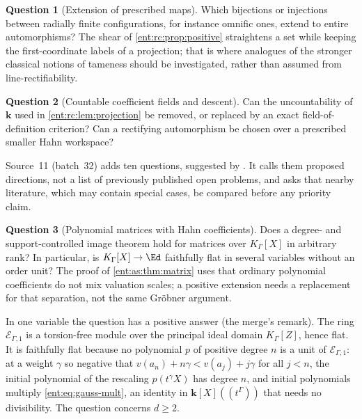 \documentclass[11pt]{article}
\theoremstyle{plain}
\theoremstyle{plain}
\theoremstyle{plain}
\theoremstyle{definition}
\theoremstyle{definition}
\theoremstyle{definition}
\theoremstyle{definition}
\newtheorem{question}[question]{Question}
\theoremstyle{remark}
\newcommand{\K}{K_\Gamma}\newcommand{\KD}{K_\Delta}
\newcommand{\kk}{\mathbf k}\newcommand{\PP}{\mathbb P}
\begin{document}
\begin{question}[Extension of prescribed maps]\label{ent:rc:q:extension}
Which bijections or injections between radially finite configurations, for
instance omnific ones, extend to entire automorphisms? The shear of
\cref{ent:rc:prop:positive} straightens a set while keeping the
first-coordinate labels of a projection; that is where analogues of the
stronger classical notions of tameness should be investigated, rather than
assumed from line-rectifiability.
\end{question}

\begin{question}[Countable coefficient fields and descent]
\label{ent:rc:q:descent}
Can the uncountability of $\kk$ used in \cref{ent:rc:lem:projection} be
removed, or replaced by an exact field-of-definition criterion? Can a
rectifying automorphism be chosen over a prescribed smaller Hahn workspace?
\end{question}

Source~11 (batch~32) adds ten questions, suggested by
. It calls them proposed
directions, not a list of previously published open problems, and asks that
nearby literature, which may contain special cases, be compared before any
priority claim.

\begin{question}[Polynomial matrices with Hahn coefficients]
\label{ent:as:q:matrices}
Does a degree- and support-controlled image theorem hold for matrices over
$\K[X]$ in arbitrary rank? In particular, is $\K[X]\to\Ed$ faithfully flat in
several variables without an order unit? The proof of
\cref{ent:as:thm:matrix} uses that ordinary polynomial coefficients do not mix
valuation scales; a positive extension needs a replacement for that
separation, not the same Gr\"obner argument.
\end{question}
In one variable the question has a positive answer (the merge's remark).
The ring $\mathcal E_{\Gamma,1}$ is a torsion-free module over the principal
ideal domain $\K[Z]$, hence flat. It is faithfully flat because no polynomial
$p$ of positive degree $n$ is a unit of $\mathcal E_{\Gamma,1}$: at a weight
$\gamma$ so negative that $v(a_n)+n\gamma<v(a_j)+j\gamma$ for all $j<n$, the
initial polynomial of the rescaling $p(t^\gamma X)$ has degree $n$, and initial
polynomials multiply \eqref{ent:eq:gauss-mult}, an identity in
$\kk[X]((t^\Gamma))$ that needs no divisibility. The question concerns
$d\ge2$.
\end{document}
